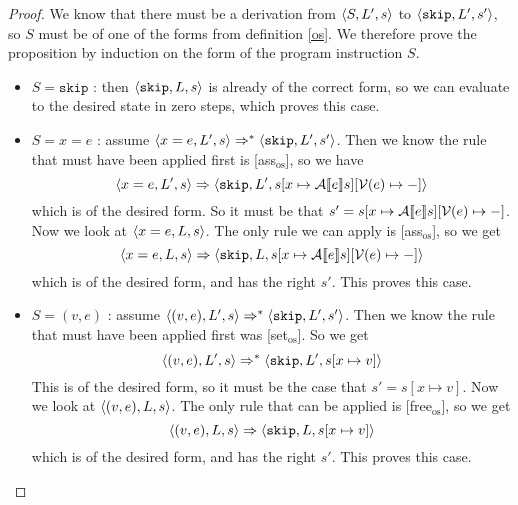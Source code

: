 \begin{proof}
We know that there must be a derivation from $\langle S, L', s \rangle$ to $\langle \texttt{skip}, L', s' \rangle$, so $S$ must be of one of the forms from definition \ref{os}. We therefore prove the proposition by induction on the form of the program instruction $S$.

\begin{itemize}[noitemsep]
    \item $S = \texttt{skip}$ : then $\langle \texttt{skip}, L, s \rangle$ is already of the correct form, so we can evaluate to the desired state in zero steps, which proves this case. 
    
    \item $S = x =  e$ : assume $\langle x = e, L', s \rangle \Rightarrow ^{*} \langle \texttt{skip}, L', s' \rangle$. Then we know the rule that must have been applied first is [ass$_{\textrm{os}}$], so we have 
    $$\langle x = e, L', s \rangle \Rightarrow \langle \texttt{skip}, L', s[x \mapsto \mathcal{A} \llbracket e \rrbracket s][\mathcal{V}(e)\mapsto-] \rangle$$
    which is of the desired form. So it must be that $s' = s[x \mapsto \mathcal{A} \llbracket e \rrbracket s][\mathcal{V}(e)\mapsto-]$. Now we look at $\langle x = e, L, s \rangle$. The only rule we can apply is [ass$_{\textrm{os}}$], so we get 
    $$\langle x = e, L, s \rangle \Rightarrow \langle \texttt{skip}, L, s [x \mapsto \mathcal{A} \llbracket e \rrbracket s][\mathcal{V}(e)\mapsto-] \rangle$$
    which is of the desired form, and has the right $s'$. This proves this case. 
    
    \item $S = (v,e)$ : assume $\langle (v,e), L', s \rangle \Rightarrow ^{*} \langle \texttt{skip}, L', s' \rangle$. Then we know the rule that must have been applied first was [set$_{\textrm{os}}$]. So we get
    $$\langle (v,e), L', s \rangle \Rightarrow ^{*} \langle \texttt{skip}, L', s[x\mapsto v] \rangle$$ 
    This is of the desired form, so it must be the case that $s' = s[x\mapsto v]$. Now we look at $\langle (v,e), L, s \rangle$. The only rule that can be applied is [free$_{\textrm{os}}$], so we get $$\langle (v,e), L, s \rangle \Rightarrow  \langle \texttt{skip}, L, s[x\mapsto v] \rangle$$
    which is of the desired form, and has the right $s'$. This proves this case.
    

\end{itemize}
\end{proof}
